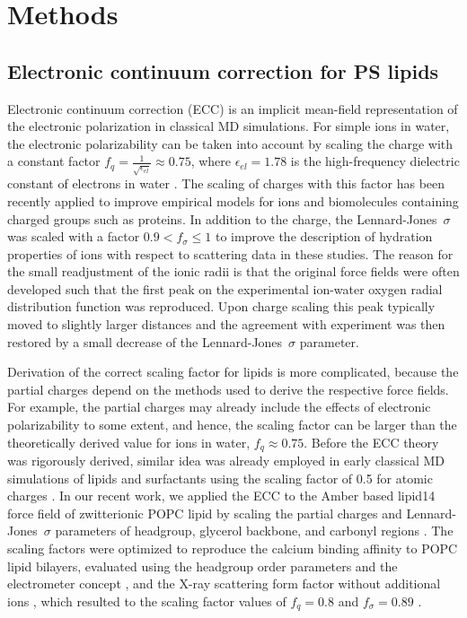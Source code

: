 \documentclass[journal=jpcbfk,manuscript=article]{achemso}
\begin{document}
\section{Methods} 
 
\subsection{Electronic continuum correction for PS lipids}\label{section:ecc} 

Electronic continuum correction (ECC) is an implicit mean-field representation of 
the electronic polarization in classical MD simulations. 
For simple ions in water, the electronic polarizability
can be taken into account by scaling the charge with a constant factor 
 \mbox{$ f_q = \frac{1}{\sqrt{\epsilon_{el}}} \approx 0.75$,}
where  $\epsilon_{el} = 1.78$ is the high-frequency dielectric constant of electrons in water \cite{leontyev09}.
The scaling of charges with this factor has been recently applied to improve empirical models for ions and
 biomolecules containing charged groups such as proteins\cite{Pluharova2014, martinek17, duboue2018insulin, Mason2019, Duboue2018MgZn}.
In addition to the charge, the Lennard-Jones~$\sigma$ was scaled with a factor $ 0.9 < f_\sigma \leq 1$
to improve the description of hydration properties of ions with respect to scattering data in these studies. The reason for the small readjustment of the ionic radii is that the original force fields were often developed such that the first peak on the experimental ion-water oxygen radial distribution function was reproduced. Upon charge scaling this peak typically moved to slightly larger distances and the agreement with experiment was then restored by a small decrease of the Lennard-Jones~$\sigma$ parameter.

Derivation of the correct scaling factor for lipids is more complicated, because
the partial charges depend on the methods used to derive the respective force fields.
For example, the partial charges may already include the effects of electronic polarizability to some extent,
and hence, the scaling factor can be larger than the theoretically derived value for ions in water, $f_q \approx 0.75$.
Before the ECC theory was rigorously derived, similar idea was already employed in early classical 
MD simulations of lipids and surfactants using the scaling factor of 0.5 for atomic charges  \cite{jonsson86,egberts94, berendsen1996}. 
In our recent work, we applied the ECC to the Amber based lipid14 force field of zwitterionic POPC lipid \cite{dickson14}
by scaling the partial charges and Lennard-Jones~$\sigma$ parameters of headgroup, glycerol backbone,
and carbonyl regions \cite{melcr18}. The scaling factors were optimized to reproduce 
the calcium binding affinity to POPC lipid bilayers, evaluated using the headgroup order parameters
and the electrometer concept \cite{akutsu81,altenbach84,seelig87,catte16}, and the X-ray scattering form factor
without additional ions \cite{kucerka11}, which resulted to the scaling factor values of $f_q = 0.8$ and $f_\sigma = 0.89$  \cite{melcr18}.
\end{document}
